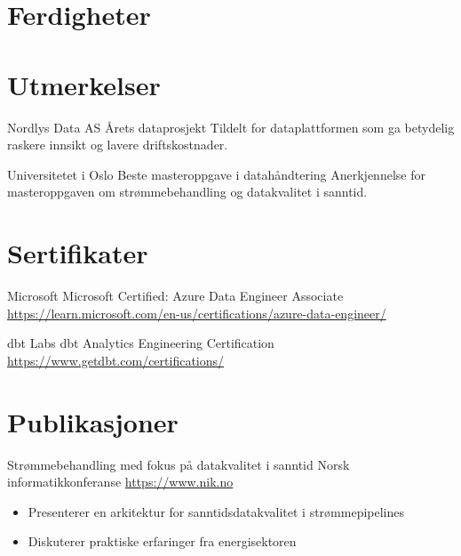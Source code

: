 \documentclass[a4paper, serif, 10pt]{moderncv}
\begin{document}
\section{Ferdigheter}

\section{Utmerkelser}

        {Nordlys Data AS}
        {Årets dataprosjekt}
        {}
        {}
        {Tildelt for dataplattformen som ga betydelig raskere innsikt og lavere driftskostnader.}

        {Universitetet i Oslo}
        {Beste masteroppgave i datahåndtering}
        {}
        {}
        {Anerkjennelse for masteroppgaven om strømmebehandling og datakvalitet i sanntid.}
\section{Sertifikater}

        {Microsoft}
        {Microsoft Certified: Azure Data Engineer Associate}
        {\url{https://learn.microsoft.com/en-us/certifications/azure-data-engineer/}}
        {}
        {}

        {dbt Labs}
        {dbt Analytics Engineering Certification}
        {\url{https://www.getdbt.com/certifications/}}
        {}
        {}
\section{Publikasjoner}

        {Strømmebehandling med fokus på datakvalitet i sanntid}
        {Norsk informatikkonferanse}
        {\url{https://www.nik.no}}
        {}
        {\begin{itemize}
\item Presenterer en arkitektur for sanntidsdatakvalitet i strømmepipelines
\item Diskuterer praktiske erfaringer fra energisektoren
\end{itemize}}
\end{document}
